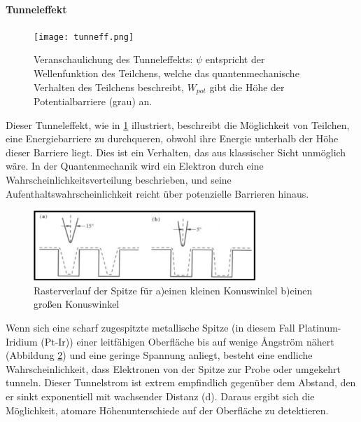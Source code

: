 \paragraph{Tunneleffekt}
\begin{figure}[H]
\centering
\texttt{[image: tunneff.png]}
\caption{Veranschaulichung des Tunneleffekts:
$\psi$ entspricht der Wellenfunktion des Teilchens, welche das quantenmechanische Verhalten des Teilchens beschreibt, $W_{pot}$ gibt die Höhe der Potentialbarriere (grau) an. \cite{Tunneleff}}
\label{fig:tunnel}  
\end{figure}
Dieser Tunneleffekt, wie in \cref{fig:tunnel} illustriert, beschreibt die Möglichkeit von Teilchen, eine Energiebarriere zu durchqueren, obwohl ihre Energie unterhalb der Höhe dieser Barriere liegt. 
Dies ist ein Verhalten, das aus klassischer Sicht unmöglich wäre. In der Quantenmechanik wird ein Elektron durch eine Wahrscheinlichkeitsverteilung beschrieben, und seine Aufenthaltswahrscheinlichkeit reicht über potenzielle Barrieren hinaus.\\
\begin{figure}[H]
\centering
\includegraphics[width=0.75\textwidth]{figs/tunnelspitze}
\caption{ Rasterverlauf der Spitze für a)einen kleinen Konuswinkel b)einen großen Konuswinkel \cite{piezo}}
\label{fig:raster}
\end{figure} 



Wenn sich eine scharf zugespitzte metallische Spitze (in diesem Fall Platinum-Iridium (Pt-Ir)) einer leitfähigen Oberfläche bis auf wenige Ångström nähert (Abbildung \ref{fig:raster}) und eine geringe Spannung anliegt, besteht eine endliche Wahrscheinlichkeit, dass Elektronen von der Spitze zur Probe oder umgekehrt tunneln. Dieser Tunnelstrom ist extrem empfindlich gegenüber dem Abstand, den er sinkt exponentiell mit wachsender Distanz (d). 
Daraus ergibt sich die Möglichkeit, atomare Höhenunterschiede auf der Oberfläche zu detektieren.


